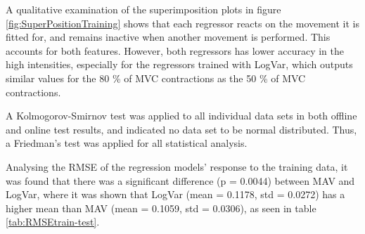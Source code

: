 \begin{multicols}{2}
	

A qualitative examination of the superimposition plots in figure \ref{fig:SuperPositionTraining} shows that each regressor reacts on the movement it is fitted for, and remains inactive when another movement is performed. This accounts for both features. However, both regressors has lower accuracy in the high intensities, especially for the regressors trained with LogVar, which outputs similar values for the 80 \% of MVC contractions as the 50 \% of MVC contractions.
	

	\begin{center}
		 \label{tab:RMSEtrain-test}
	\end{center}
	
	A Kolmogorov-Smirnov test was applied to all individual data sets in both offline and online test results, and indicated no data set to be normal distributed. Thus, a Friedman's test was applied for all statistical analysis.
	
	Analysing the RMSE of the regression models' response to the training data, it was found that there was a significant difference (p = 0.0044) between MAV and LogVar, where it was shown that LogVar (mean = 0.1178, std = 0.0272) has a higher mean than MAV (mean = 0.1059, std = 0.0306), as seen in table \ref{tab:RMSEtrain-test}. 
	

\end{multicols}

